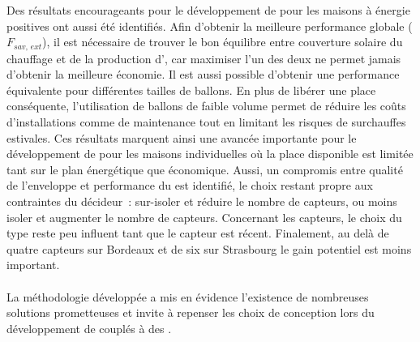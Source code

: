 Des résultats encourageants pour le développement de  pour les maisons à énergie
positives ont aussi été identifiés. Afin d’obtenir la meilleure performance globale
($F_{sav,\, ext}$), il est nécessaire de trouver le bon équilibre entre couverture solaire
du chauffage et de la production d’, car maximiser l’un des deux ne permet jamais
d’obtenir la meilleure économie. Il est aussi possible d’obtenir une performance
équivalente pour différentes tailles de ballons. En plus de libérer une place conséquente,
l’utilisation de ballons de faible volume permet de réduire les coûts d’installations comme
de maintenance tout en limitant les risques de surchauffes estivales. Ces résultats
marquent ainsi une avancée importante pour le développement de
 pour les maisons individuelles où la place disponible est limitée tant sur le
plan énergétique que économique.
Aussi, un compromis entre qualité de l’enveloppe et
performance du  est identifié, le choix restant propre aux contraintes du décideur~: sur-isoler
et réduire le nombre de capteurs, ou moins isoler et augmenter le nombre de capteurs.
Concernant les capteurs, le choix du type reste peu influent tant que le capteur
est récent. Finalement, au delà de quatre capteurs sur Bordeaux et de six sur Strasbourg le
gain potentiel est moins important.

\paragraph{} %
La méthodologie développée a mis en évidence l’existence de nombreuses solutions
prometteuses et invite à repenser les choix de conception lors du développement de
 couplés à des .
